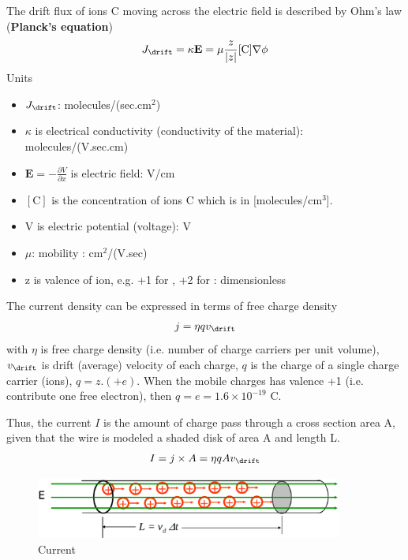 The drift flux of ions C moving across the electric field is described
by Ohm's law ({\bf Planck's equation})
\begin{eqnarray}
  \label{eq:407}
  J_\drift = \kappa\mathbf{E} = \mu \frac{z}{|z|} [\text{C}] \nabla \phi
\end{eqnarray}
Units
\begin{itemize}
\item $J_\drift$: molecules/(sec.cm$^2$)
\item $\kappa$ is electrical conductivity (conductivity of the
  material): molecules/(V.sec.cm)
\item $\mathbf{E}=-\frac{\partial V}{\partial x}$ is electric field:
  V/cm
\item  $[\text{C}]$ is the concentration of ions C which
  is in [molecules/cm$^3$].
\item V is electric potential (voltage): V
\item $\mu$: mobility : cm$^2$/(V.sec)
\item z is valence of ion, e.g. +1 for , +2 for  :
  dimensionless
\end{itemize}

The current density can be expressed in terms of free charge density
\begin{eqnarray}
  \label{eq:408}
  j=\eta qv_\drift
\end{eqnarray}
with $\eta$ is free charge density (i.e. number of charge carriers per
unit volume), $v_\drift$ is drift (average) velocity of each charge,
$q$ is the charge of a single charge carrier (ions), $q=z.(+e)$. When
the mobile charges has valence +1 (i.e. contribute one free electron),
then $q=e=1.6\times 10^{-19}$ C.


Thus, the current $I$ is the amount of charge pass through a cross
section area A, given that the wire is modeled a shaded disk of area A
and length L.
\begin{eqnarray}
  \label{eq:411}
  I = j\times A =  \eta qAv_\drift
\end{eqnarray}
\begin{figure}[hbt]
  \centerline{\includegraphics[height=2cm,
    angle=0]{./images/current.eps}}
  \caption{Current}
  \label{fig:current}
\end{figure}

